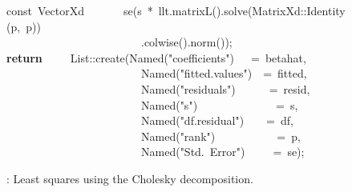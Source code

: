 \documentclass[shortnames,article]{jss}
\newcommand{\hlstd}[1]{\textcolor[rgb]{0,0,0}{#1}}
\newcommand{\hlopt}[1]{\textcolor[rgb]{0,0,0}{#1}}
\newcommand{\hlstr}[1]{\textcolor[rgb]{0.90,0.15,0.15}{#1}}
\newcommand{\hlkwa}[1]{\textcolor[rgb]{0.61,0.13,0.93}{\bf{#1}}}
\newcommand{\hlkwb}[1]{\textcolor[rgb]{0.13,0.54,0.13}{#1}}
\newcommand{\hlkwd}[1]{\textcolor[rgb]{0,0,0}{#1}}
\begin{document}
\begin{figure}[tbh]
  \hlstd{}\hlkwb{const\ }\hlstd{VectorXd}\hlstd{\ \ \ \ \ \ \ }\hlstd{}\hlkwd{se}\hlstd{}\hlopt{(}\hlstd{s\ }\hlopt{{*}\ }\hlstd{llt}\hlopt{.}\hlstd{}\hlkwd{matrixL}\hlstd{}\hlopt{().}\hlstd{}\hlkwd{solve}\hlstd{}\hlopt{(}\hlstd{MatrixXd}\hlopt{::}\hlstd{}\hlkwd{Identity}\hlstd{}\hlopt{(}\hlstd{p}\hlopt{,\ }\hlstd{p}\hlopt{))}\hspace*{\fill}\\
  \hlstd{}\hlstd{\ \ \ \ \ \ \ \ \ \ \ \ \ \ \ \ \ \ \ \ \ \ \ \ }\hlstd{}\hlopt{.}\hlstd{}\hlkwd{colwise}\hlstd{}\hlopt{().}\hlstd{}\hlkwd{norm}\hlstd{}\hlopt{());}\hspace*{\fill}\\
  \hlstd{}\hlkwa{return}\hlstd{\ \ \ \ \ }\hlkwa{}\hlstd{List}\hlopt{::}\hlstd{}\hlkwd{create}\hlstd{}\hlopt{(}\hlstd{Named}\hlopt{{(}}\hlstd{}\hlstr{"coefficients"}\hlstd{}\hlopt{{)}}\hlstd{\ \ \ }\hlopt{=\ }\hlstd{betahat}\hlopt{,}\hspace*{\fill}\\
  \hlstd{}\hlstd{\ \ \ \ \ \ \ \ \ \ \ \ \ \ \ \ \ \ \ \ \ \ \ \ }\hlstd{Named}\hlopt{{(}}\hlstd{}\hlstr{"fitted.values"}\hlstd{}\hlopt{{)}}\hlstd{\ \ }\hlopt{=\ }\hlstd{fitted}\hlopt{,}\hspace*{\fill}\\
  \hlstd{}\hlstd{\ \ \ \ \ \ \ \ \ \ \ \ \ \ \ \ \ \ \ \ \ \ \ \ }\hlstd{Named}\hlopt{{(}}\hlstd{}\hlstr{"residuals"}\hlstd{}\hlopt{{)}}\hlstd{\ \ \ \ \ \ }\hlopt{=\ }\hlstd{resid}\hlopt{,}\hspace*{\fill}\\
  \hlstd{}\hlstd{\ \ \ \ \ \ \ \ \ \ \ \ \ \ \ \ \ \ \ \ \ \ \ \ }\hlstd{Named}\hlopt{{(}}\hlstd{}\hlstr{"s"}\hlstd{}\hlopt{{)}}\hlstd{\ \ \ \ \ \ \ \ \ \ \ \ \ \ }\hlopt{=\ }\hlstd{s}\hlopt{,}\hspace*{\fill}\\
  \hlstd{}\hlstd{\ \ \ \ \ \ \ \ \ \ \ \ \ \ \ \ \ \ \ \ \ \ \ \ }\hlstd{Named}\hlopt{{(}}\hlstd{}\hlstr{"df.residual"}\hlstd{}\hlopt{{)}}\hlstd{\ \ \ \ }\hlopt{=\ }\hlstd{df}\hlopt{,}\hspace*{\fill}\\
  \hlstd{}\hlstd{\ \ \ \ \ \ \ \ \ \ \ \ \ \ \ \ \ \ \ \ \ \ \ \ }\hlstd{Named}\hlopt{{(}}\hlstd{}\hlstr{"rank"}\hlstd{}\hlopt{{)}}\hlstd{\ \ \ \ \ \ \ \ \ \ \ }\hlopt{=\ }\hlstd{p}\hlopt{,}\hspace*{\fill}\\
  \hlstd{}\hlstd{\ \ \ \ \ \ \ \ \ \ \ \ \ \ \ \ \ \ \ \ \ \ \ \ }\hlstd{Named}\hlopt{{(}}\hlstd{}\hlstr{"Std.\ Error"}\hlstd{}\hlopt{{)}}\hlstd{\ \ \ \ \ }\hlopt{=\ }\hlstd{se}\hlopt{);}\hlstd{}\hspace*{\fill}\\
  \mbox{}
  \normalfont
  \normalsize
  \caption{: Least squares using the Cholesky decomposition.}
  \label{lltLS}
\end{figure}
\end{document}
